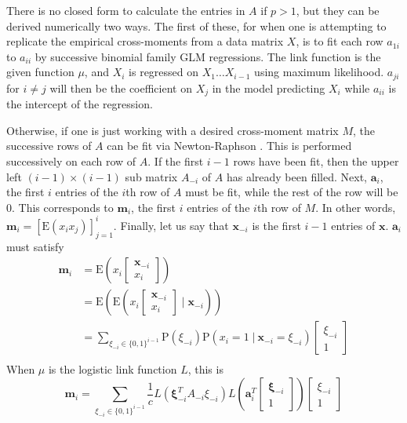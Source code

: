 \documentclass[11pt]{article}
\newcommand{\p}{\mathrm{P}}
\newcommand{\E}{\mathrm{E}}
\newcommand{\st}{ \; \big | \:}
\theoremstyle{definition}
\begin{document}
    There is no closed form to calculate the entries in $A$ if $p>1$, but they can be derived numerically two ways. The first of these, for when one is attempting to replicate the empirical cross-moments from a data matrix $X$, is to fit each row $a_{1i}$ to $a_{ii}$ by successive binomial family GLM regressions. The link function is the given function $\mu$, and $X_i$ is regressed on $X_{1} \ldots X_{i-1}$ using maximum likelihood. $a_{ji}$ for $i\neq j$ will then be the coefficient on $X_j$ in the model predicting $X_i$ while $a_{ii}$ is the intercept of the regression. \par
    Otherwise, if one is just working with a desired cross-moment matrix $M$, the successive rows of $A$ can be fit via Newton-Raphson \cite{2011arXiv1111.0576S}. This is performed successively on each row of $A$. If the first $i-1$ rows have been fit, then the upper left $(i-1)\times(i-1)$ sub matrix $A_{-i}$ of $A$ has already been filled. Next, $\mathbf a_i$, the first $i$ entries of the $i$th row of $A$ must be fit, while the rest of the row will be 0. This corresponds to $\mathbf m_i$, the first $i$ entries of the $i$th row of $M$. In other words, $\mathbf{m}_i = [\E(x_i x_j)]_{j=1}^{i}$. Finally, let us say that $\mathbf x_{-i}$ is the first $i-1$ entries of $\mathbf x$. $\mathbf a_i$ must satisfy 
            \begin{align*}
                \mathbf m_i &= \E\left(x_i \left[\begin{array}{c} \mathbf x_{-i} \\ x_i \end{array}\right]\right) \\
                 &= \E\left(\E\left(x_i \left[\begin{array}{c} \mathbf x_{-i} \\ x_i \end{array}\right]\;\bigg \vert\; \mathbf x_{-i}\right)\right)\\
                 &= \sum_{\xi_{-i} \in \{0,1\}^{i-1}} \p(\xi_{-i})\p(x_i=1\st \mathbf x_{-i}=\xi_{-i}) \left[\begin{array}{c} \xi_{-i} \\ 1 \end{array}\right] \\
            \end{align*}
            When $\mu$ is the logistic link function $L$, this is
            \[ \mathbf m_i = \sum_{\xi_{-i} \in \{0,1\}^{i-1}} \frac{1}{c}L\left(\mathbf \xi_{-i}^TA_{-i}\xi_{-i}\right) L\left(\mathbf{a}_i^T\left[\begin{array}{c} \mathbf \xi_{-i} \\ 1 \end{array}\right]\right)\left[\begin{array}{c} \xi_{-i} \\ 1 \end{array}\right] \]
\end{document}
